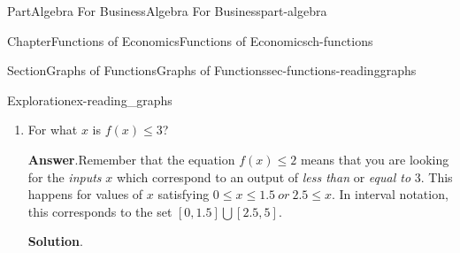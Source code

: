 \documentclass{tufte-book}
\newcommand{\blocktitlefont}{\relax}
\numberwithin{equation}{chapter}
\newcommand{\lt}{<}
\begin{document}
\begin{partptx}{Part}{Algebra For Business}{}{Algebra For Business}{}{}{part-algebra}
\begin{chapterptx}{Chapter}{Functions of Economics}{}{Functions of Economics}{}{}{ch-functions}
\begin{sectionptx}{Section}{Graphs of Functions}{}{Graphs of Functions}{}{}{sec-functions-readinggraphs}
\begin{exploration}{Exploration}{}{ex-reading_graphs}
\begin{enumerate}[font=\bfseries,label=(\alph*),ref=\alph*]
\begin{image}{0.25}{0.5}{0.25}{}
{
}%
\end{image}%
Remember that the equation \(f(x)\lt 2\) means that you are looking for the \emph{inputs} \(x\) which correspond to an output of \emph{strictly less than} \(2\). To understand this inequality, follow the graph of the function, moving through  \(x\)-values from left to right.%
\par
Above \(x=0\), the height is \(1\) which is less than \(2\). Moving right, the height of the function increases, but stays below \(2\) until we reach \(x=1\). That means that the function is \emph{less than} or \emph{equal to} 2 on the interval \([0,1]\). But because we want the height to be \emph{strictly less than} 2, we must exclude 1, giving us the interval \([0,1)\).%
\par
Similarly, the height is also less than 2 between \(x=3\) and \(x=5\), and equal to 2 at those endpoints, so the function is \emph{strictly less than} 2 on the interval \((3,5)\)%
\par
Putting it all together, we have that \(f(x)\lt 2\) on the set \([0,1)\bigcup (3,5)\), or equivalently when \(0\leq x\lt 1\ or\ 3\lt x\lt 5\).%
\item{}For what  \(x\) is \(f(x)\leq 3\)?%
\par\smallskip%
\noindent\textbf{\blocktitlefont Answer}.\hypertarget{ex-reading_graphs-5-2}{}\quad{}Remember that the equation \(f(x)\leq 2\) means that you are looking for the \emph{inputs} \(x\) which correspond to an output of \emph{less than} or \emph{equal to} \(3\). This happens for values of \(x\) satisfying \(0\leq x\leq 1.5\ or\ 2.5 \leq x\). In interval notation, this corresponds to the set \([0,1.5]\bigcup [2.5,5]\).%
\par\smallskip%
\noindent\textbf{\blocktitlefont Solution}.\hypertarget{ex-reading_graphs-5-3}{}\quad{}\begin{image}{0.25}{0.5}{0.25}{}%
\end{image}
\end{enumerate}
\end{exploration}
\end{sectionptx}
\end{chapterptx}
\end{partptx}
\end{document}
